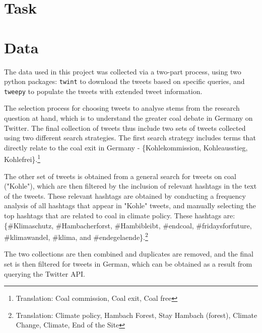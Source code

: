 \documentclass[9pt,twocolumn,twoside,lineno]{pnas-new}
\begin{document}
\section*{Task}


\section*{Data}
The data used in this project was collected via a two-part process, using two python packages: \texttt{twint} to download the tweets based on specific queries, and \texttt{tweepy} to populate the tweets with extended tweet information. %


The selection process for choosing tweets to analyse stems from the research question at hand, which is to understand the greater coal debate in Germany on Twitter. The final collection of tweets thus include two sets of tweets collected using two different search strategies. The first search strategy includes terms that directly relate to the coal exit in Germany - \{Kohlekommission, Kohleausstieg, Kohlefrei\}.\footnote{Translation: Coal commission, Coal exit, Coal free}

The other set of tweets is obtained from a general search for tweets on coal ("Kohle"), which are then filtered by the inclusion of relevant hashtags in the text of the tweets. These relevant hashtags are obtained by conducting a frequency analysis of all hashtags that appear in "Kohle" tweets, and manually selecting the top hashtags that are related to coal in climate policy. These hashtags are:  \{\#Klimaschutz, \#Hambacherforst, \#Hambibleibt, \#endcoal, \#fridaysforfuture, \#klimawandel, \#klima, and \#endegelaende\}.\footnote{Translation: Climate policy, Hambach Forest, Stay Hambach (forest), Climate Change, Climate, End of the Site} 

The two collections are then combined and duplicates are removed, and the final set is then filtered for tweets in German, which can be obtained as a result from querying the Twitter API. 
\end{document}
